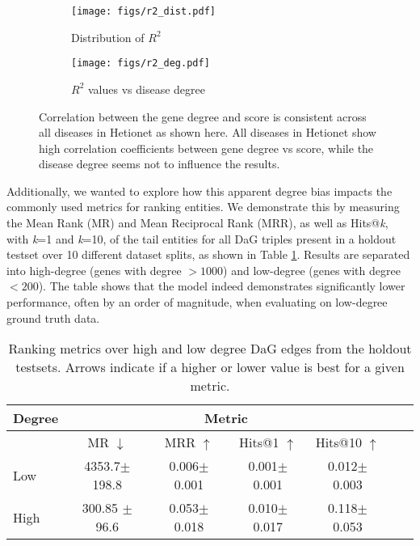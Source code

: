 \begin{figure}[!ht]
	\centering
	\begin{subfigure}[b]{0.45\textwidth}
		\centering
		\texttt{[image: figs/r2\_dist.pdf]}
		\caption{Distribution of \(R^2\)}\label{fig:r2:violin}
	\end{subfigure}
	\begin{subfigure}[b]{0.45\textwidth}
		\centering
		\texttt{[image: figs/r2\_deg.pdf]}
		\caption{\(R^2\) values vs disease degree}\label{fig:r2:dist}
	\end{subfigure}
	\caption{Correlation between the gene degree and score is consistent across all diseases in Hetionet as shown here. All diseases in Hetionet show high correlation coefficients between gene degree vs score, while the disease degree seems not to influence the results.}
	\label{fig:r2_over_disease}
\end{figure}

Additionally, we wanted to explore how this apparent degree bias impacts the commonly used metrics for ranking entities. We demonstrate this by measuring the Mean Rank (MR) and Mean Reciprocal Rank (MRR), as well as Hits@\textit{k}, with \textit{k}=1 and \textit{k}=10, of the tail entities for all DaG triples present in a holdout testset over 10 different dataset splits, as shown in Table \ref{tab:metrics}. Results are separated into high-degree (genes with degree \(>1000\)) and low-degree (genes with degree \(<200\)). The table shows that the model indeed demonstrates significantly lower performance, often by an order of magnitude, when evaluating on low-degree ground truth data.

\begin{table}[h!]
	\centering

	\begin{tabular}{l  c c c  c c c  }
		\toprule
		\textbf{Degree} & \multicolumn{4}{c}{\textbf{Metric}} \T\B                                                                    \\
		\midrule \midrule
		                & MR \(\downarrow\)                        & MRR \(\uparrow\)  & Hits@1 \(\uparrow\) & Hits@10 \(\uparrow\)\B \\
		\cline{2-5}
		Low             & 4353.7\(\pm\)198.8                       & 0.006\(\pm\)0.001 & 0.001\(\pm\)0.001   & 0.012\(\pm\)0.003\T    \\
		High            & 300.85 \(\pm\)96.6                       & 0.053\(\pm\)0.018 & 0.010\(\pm\)0.017   & 0.118\(\pm\)0.053\B    \\
		\bottomrule
	\end{tabular}
	\vspace{5pt}
	\caption{Ranking metrics over high and low degree DaG edges from the holdout testsets. Arrows indicate if a higher or lower value is best for a given metric.}
	\label{tab:metrics}
\end{table}

